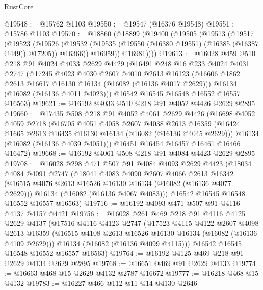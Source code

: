 \begin{lexlean}{RustCore}
\begin{coremodule}
@19548 := @15762 @1103
@19550 := @19547 (@16376 @19548)
@19551 := @15786 @1103
@19570 := @18860
    (@18899
      (@19400
        (@19505
          (@19513
            (@19517
              (@19523
                (@19526
                  (@19532 (@19535 (@19550 (@16380 @19551) (@16385 (@16387 @449)) @17205)) @16366))
                @16959))
            @16981))))
@19613 := @16028
    @459
    @510
    @218
    @91
    @4024
    @4033
    @2629
    @4429
    (@16491
      @248
      @16
      @233
      @4024
      @4031
      @2747
      (@17245
        @4023
        @4030
        @2607
        @4010
        @2613
        @16123
        (@16606 @1862 @2613 @16617 @16130 @16134 (@16082 (@16136 @4017 @2629)))
        @16134
        (@16082 (@16136 @4011 @4023)))
      @16542
      @16545
      @16548
      @16552
      @16557
      @16563)
@19621 := @16192 @4033 @510 @218 @91 @4052 @4426 @2629 @2895
@19660 := @17435
    @508
    @218
    @91
    @4052
    @4061
    @2629
    @4426
    (@16698
      @4052
      @4059
      @2718
      (@16705
        @4051
        @4058
        @2607
        @4038
        @2613
        @16359
        (@16424 @1665 @2613 @16435 @16130 @16134 (@16082 (@16136 @4045 @2629)))
        @16134
        (@16082 (@16136 @4039 @4051)))
      @16451
      @16454
      @16457
      @16461
      @16466
      @16472)
@19668 := @16192 @4061 @508 @218 @91 @4084 @4423 @2629 @2895
@19708 := @16028
    @298
    @471
    @507
    @91
    @4084
    @4093
    @2629
    @4423
    (@18034
      @4084
      @4091
      @2747
      (@18041
        @4083
        @4090
        @2607
        @4066
        @2613
        @16342
        (@16515 @4076 @2613 @16526 @16130 @16134 (@16082 (@16136 @4077 @2629)))
        @16134
        (@16082 (@16136 @4067 @4083)))
      @16542
      @16545
      @16548
      @16552
      @16557
      @16563)
@19716 := @16192 @4093 @471 @507 @91 @4116 @4137 @4157 @4421
@19756 := @16028
    @261
    @469
    @218
    @91
    @4116
    @4125
    @2629
    @4137
    (@17516
      @4116
      @4123
      @2747
      (@17523
        @4115
        @4122
        @2607
        @4098
        @2613
        @16359
        (@16515 @4108 @2613 @16526 @16130 @16134 (@16082 (@16136 @4109 @2629)))
        @16134
        (@16082 (@16136 @4099 @4115)))
      @16542
      @16545
      @16548
      @16552
      @16557
      @16563)
@19764 := @16192 @4125 @469 @218 @91 @2629 @4134 @2629 @2895
@19768 := @16651 @469 @91 @2629 @4133
@19774 := @16663 @468 @15 @2629 @4132 @2787 @16672
@19777 := @16218 @468 @15 @4132
@19783 := @16227 @466 @112 @11 @14 @4130 @2646

\end{coremodule}
\end{lexlean}
